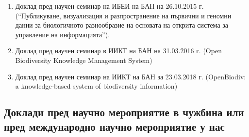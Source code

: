 \begin{enumerate}
    \item Доклад пред научен семинар на ИБЕИ на БАН на 26.10.2015 г. (“Публикуване, визуализация и разпространение на първични и геномни данни за биологичното разнообразие на основата на открита система за управление на информацията”).
    \item Доклад пред научен семинар в ИИКТ на БАН на 31.03.2016 г. (Open Biodiversity Knowledge Management System)
    \item Доклад пред научен семинар на ИИКТ на БАН за 23.03.2018 г. (OpenBiodiv: a knowledge-based system of biodiversity information)
\end{enumerate}

\subsection*{Доклади пред научно мероприятие в чужбина или пред международно научно мероприятие у нас}

